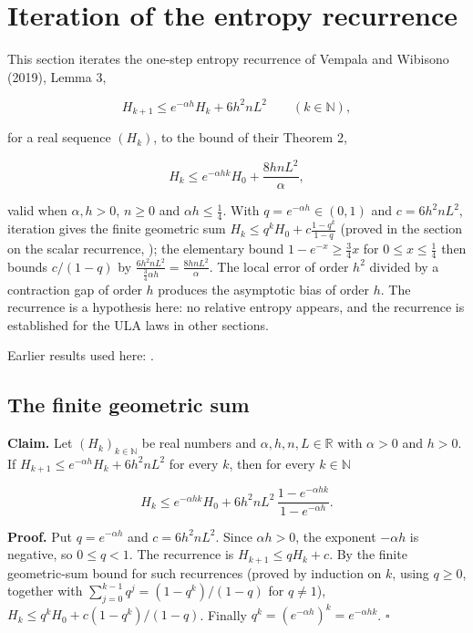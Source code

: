 \documentclass[11pt,a4paper]{report}
\begin{document}
\section{\texorpdfstring{Iteration of the entropy recurrence}{Iteration of the entropy recurrence}}
\label{proof-module-UnadjustedLangevin-LSI-DiscreteEntropy-lean}


This section iterates the one-step entropy recurrence of Vempala and Wibisono (2019), Lemma 3,


\[H_{k+1}\le e^{-\alpha h}H_k+6h^2nL^2\qquad(k\in\mathbb N),\]


for a real sequence \((H_k)\), to the bound of their Theorem 2,


\[H_k\le e^{-\alpha hk}H_0+\frac{8hnL^2}{\alpha},\]


valid when \(\alpha,h>0\), \(n\ge0\) and \(\alpha h\le\frac14\). With \(q=e^{-\alpha h}\in(0,1)\) and \(c=6h^2nL^2\), iteration gives the finite geometric sum \(H_k\le q^kH_0+c\frac{1-q^k}{1-q}\) (proved in the section on the scalar recurrence, \cite[Section~3.15.2]{LangevinLean2026ULASC}); the elementary bound \(1-e^{-x}\ge\frac34x\) for \(0\le x\le\frac14\) then bounds \(c/(1-q)\) by \(\frac{6h^2nL^2}{\frac34\alpha h}=\frac{8hnL^2}{\alpha}\). The local error of order \(h^2\) divided by a contraction gap of order \(h\) produces the asymptotic bias of order \(h\). The recurrence is a hypothesis here: no relative entropy appears, and the recurrence is established for the ULA laws in other sections.



Earlier results used here: \cite[Section~3.15]{LangevinLean2026ULASC}.
\subsection{\texorpdfstring{The finite geometric sum}{The finite geometric sum}}
\label{report-step-UnadjustedLangevin-LSI-DiscreteEntropy-lean-1}


\textbf{Claim.} Let \((H_k)_{k\in\mathbb N}\) be real numbers and \(\alpha,h,n,L\in\mathbb R\) with \(\alpha>0\) and \(h>0\). If \(H_{k+1}\le e^{-\alpha h}H_k+6h^2nL^2\) for every \(k\), then for every \(k\in\mathbb N\)


\[H_k\le e^{-\alpha hk}H_0+6h^2nL^2\,\frac{1-e^{-\alpha hk}}{1-e^{-\alpha h}}.\]


\textbf{Proof.} Put \(q=e^{-\alpha h}\) and \(c=6h^2nL^2\). Since \(\alpha h>0\), the exponent \(-\alpha h\) is negative, so \(0\le q<1\). The recurrence is \(H_{k+1}\le qH_k+c\). By the finite geometric-sum bound for such recurrences (proved by induction on \(k\), using \(q\ge0\), together with \(\sum_{j=0}^{k-1}q^j=(1-q^k)/(1-q)\) for \(q\neq1\)), \(H_k\le q^kH_0+c(1-q^k)/(1-q)\). Finally \(q^k=(e^{-\alpha h})^k=e^{-\alpha hk}\). \(\square\)
\end{document}
